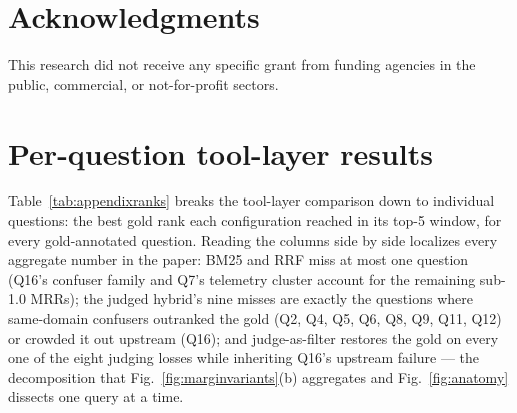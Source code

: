\section*{Acknowledgments}
This research did not receive any specific grant from funding agencies in
the public, commercial, or not-for-profit sectors. %

\appendix
\setcounter{table}{0}
\section{Per-question tool-layer results}
\label{app:perq}
Table~\ref{tab:appendixranks} breaks the tool-layer comparison down to
individual questions: the best gold rank each configuration reached in
its top-5 window, for every gold-annotated question. Reading the columns
side by side localizes every aggregate number in the paper: BM25 and RRF
miss at most one question (Q16's confuser family and Q7's telemetry
cluster account for the remaining sub-1.0 MRRs); the judged hybrid's nine
misses are exactly the questions where same-domain confusers outranked
the gold (Q2, Q4, Q5, Q6, Q8, Q9, Q11, Q12) or crowded it out upstream
(Q16); and judge-as-filter restores the gold on every one of the eight
judging losses while inheriting Q16's upstream failure --- the
decomposition that Fig.~\ref{fig:marginvariants}(b) aggregates and
Fig.~\ref{fig:anatomy} dissects one query at a time.


